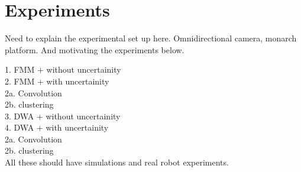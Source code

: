 \section{Experiments}
Need to explain the experimental set up here. Omnidirectional camera, monarch platform. And motivating the experiments below. 


1. FMM + without uncertainity\\
2. FMM + with uncertainity\\
	2a. Convolution\\
	2b. clustering\\

3. DWA + without uncertainity\\
4. DWA + with uncertainity\\
	2a. Convolution\\
	2b. clustering\\

All these should have simulations and real robot experiments.\\


\label{sec:results}
